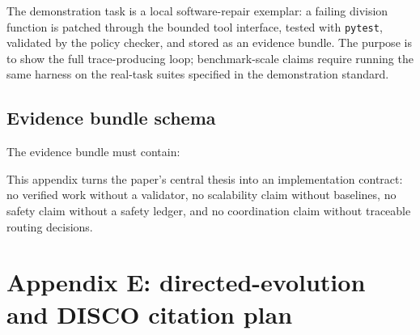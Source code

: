 The demonstration task is a local software-repair exemplar: a failing
division function is patched through the bounded tool interface, tested
with \texttt{pytest}, validated by the policy checker, and stored as an
evidence bundle. The purpose is to show the full trace-producing loop;
benchmark-scale claims require running the same harness on the real-task
suites specified in the demonstration standard.

\subsection{Evidence bundle schema}\label{evidence-bundle-schema}

The evidence bundle must contain:

\begin{Shaded}
\begin{Highlighting}[]
\FunctionTok{\{}
  \FunctionTok{:} \FunctionTok{,}
  \FunctionTok{:} \FunctionTok{,}
  \FunctionTok{:} \FunctionTok{,}
  \FunctionTok{:} \FunctionTok{,}
  \FunctionTok{:} \FunctionTok{,}
  \FunctionTok{:} \FunctionTok{,}
  \FunctionTok{:} \FunctionTok{,}
  \FunctionTok{:} \FunctionTok{,}
  \FunctionTok{:} 
\FunctionTok{\}}
\end{Highlighting}
\end{Shaded}

This appendix turns the paper's central thesis into an implementation
contract: no verified work without a validator, no scalability claim
without baselines, no safety claim without a safety ledger, and no
coordination claim without traceable routing decisions.

\section{Appendix E: directed-evolution and DISCO citation
plan}\label{appendix-e-directed-evolution-and-disco-citation-plan}

